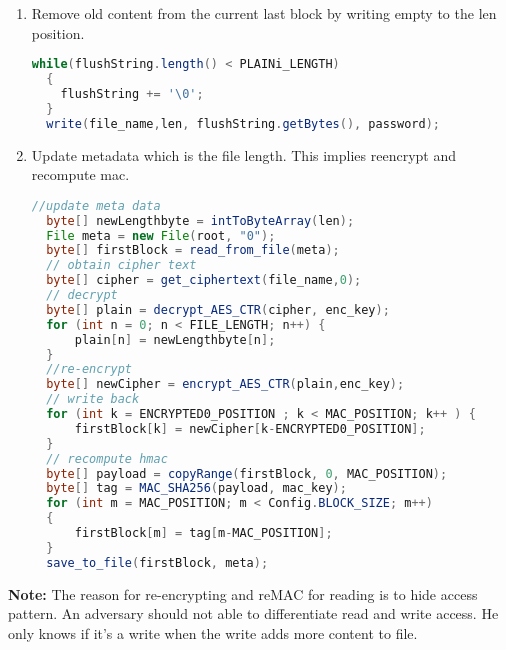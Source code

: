 \documentclass[a4paper,10pt]{article}
\begin{document}
\begin{enumerate}
\begin{lstlisting}[linewidth=\columnwidth,breaklines=true,language=Java]
    }
  }\end{lstlisting} 
  \item Remove old content from the current last block by writing empty to the len position.
  \begin{lstlisting}[linewidth=\columnwidth,breaklines=true,language=Java]
  while(flushString.length() < PLAINi_LENGTH)
  {
    flushString += '\0';
  }
  write(file_name,len, flushString.getBytes(), password);
  \end{lstlisting} 
  \item Update metadata which is the file length. This implies reencrypt and recompute mac.
  \begin{lstlisting}[linewidth=\columnwidth,breaklines=true,language=Java]
  //update meta data
  byte[] newLengthbyte = intToByteArray(len);
  File meta = new File(root, "0");
  byte[] firstBlock = read_from_file(meta);
  // obtain cipher text
  byte[] cipher = get_ciphertext(file_name,0);
  // decrypt
  byte[] plain = decrypt_AES_CTR(cipher, enc_key);
  for (int n = 0; n < FILE_LENGTH; n++) {
      plain[n] = newLengthbyte[n]; 
  }
  //re-encrypt
  byte[] newCipher = encrypt_AES_CTR(plain,enc_key);
  // write back
  for (int k = ENCRYPTED0_POSITION ; k < MAC_POSITION; k++ ) {
      firstBlock[k] = newCipher[k-ENCRYPTED0_POSITION];
  }
  // recompute hmac
  byte[] payload = copyRange(firstBlock, 0, MAC_POSITION);
  byte[] tag = MAC_SHA256(payload, mac_key);
  for (int m = MAC_POSITION; m < Config.BLOCK_SIZE; m++) 
  {
      firstBlock[m] = tag[m-MAC_POSITION];
  }
  save_to_file(firstBlock, meta);
  \end{lstlisting} 
\end{enumerate}

\textbf{Note:} The reason for re-encrypting and reMAC for reading is to hide access pattern. An adversary should not able to differentiate read and write access. He only knows if it's a write when the write adds more content to file.
\end{document}

